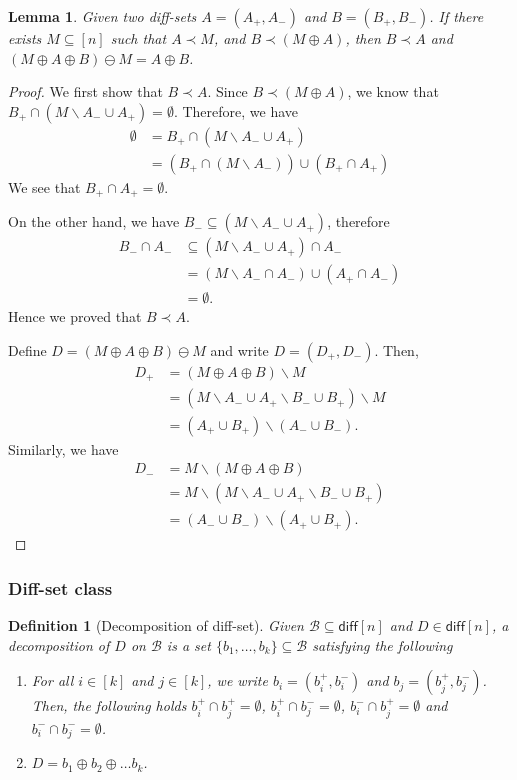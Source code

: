 \documentclass{article}
\newtheorem{define}{Definition}
\newtheorem{lemma}{Lemma}
\newcommand{\diff}{\mathsf{diff}}
\newcommand{\diffvalid}{\prec}
\newcommand{\B}{\mathcal B}
\newcommand{\del}{\backslash}
\begin{document}
\begin{spacing}{1.1}
\begin{lemma}
\label{lemma:diff-set-algebra}
Given two diff-sets $A=(A_+,A_-)$ and $B=(B_+,B_-)$. 
If there exists $M\subseteq [n]$ such that $A \diffvalid M$, and $B \diffvalid (M\oplus A)$,
then $B \diffvalid A$ and $(M\oplus A \oplus B)\ominus M = A\oplus B$.
\end{lemma}

\begin{proof}
We first show that $B\diffvalid A$.
Since $B \diffvalid (M\oplus A)$, we know that 
$B_+\cap (M\del A_- \cup A_+) = \emptyset$.
Therefore, we have
\begin{align*}
	\emptyset &= B_+\cap (M\del A_-\cup A_+) \\
			  &= (B_+\cap (M\del A_-))\cup (B_+\cap A_+)
\end{align*}
We see that $B_+\cap A_+=\emptyset$.

On the other hand, we have $B_-\subseteq (M\del A_-\cup A_+)$, therefore 
\begin{align*}
	B_-\cap A_- &\subseteq (M\del A_-\cup A_+)\cap A_- \\
				&= (M\del A_- \cap A_-)\cup (A_+\cap A_-) \\
				&= \emptyset.
\end{align*}
Hence we proved that $B\diffvalid A$.

Define $D=(M\oplus A \oplus B)\ominus M$ and write $D=(D_+,D_-)$. Then,
\begin{align*}
D_+ &= (M\oplus A\oplus B) \del M\\ 
    &= (M\del A_-\cup A_+\del B_-\cup B_+) \del M\\
    &= (A_+\cup B_+)\del(A_-\cup B_-).
\end{align*}
Similarly, we have
\begin{align*}
D_- &= M\del (M\oplus A\oplus B)\\ 
    &= M\del (M\del A_-\cup A_+\del B_-\cup B_+)\\
    &= (A_-\cup B_-)\del (A_+\cup B_+).
\end{align*}
\end{proof}

\subsubsection{Diff-set class}

\begin{define}[Decomposition of diff-set]
Given $\B\subseteq \diff[n]$ and $D\in \diff[n]$, 
a decomposition of $D$ on $\B$ is a set $\{b_1,\ldots,b_k\} \subseteq \B$ satisfying the following
\begin{enumerate}
  \item For all $i\in[k]$ and $j\in [k]$, we write $b_i=(b_i^+,b_i^-)$ and $b_j=(b_j^+,b_j^-)$. Then, the following holds
  $b_i^+\cap b_j^+=\emptyset$, $b_i^+\cap b_j^-=\emptyset$, $b_i^-\cap b_j^+ =\emptyset$ and $b_i^-\cap b_j^-=\emptyset$.
  \item $D=b_1 \oplus b_2 \oplus \ldots b_k$.
\end{enumerate}
\end{define}


\end{spacing}
\end{document}
